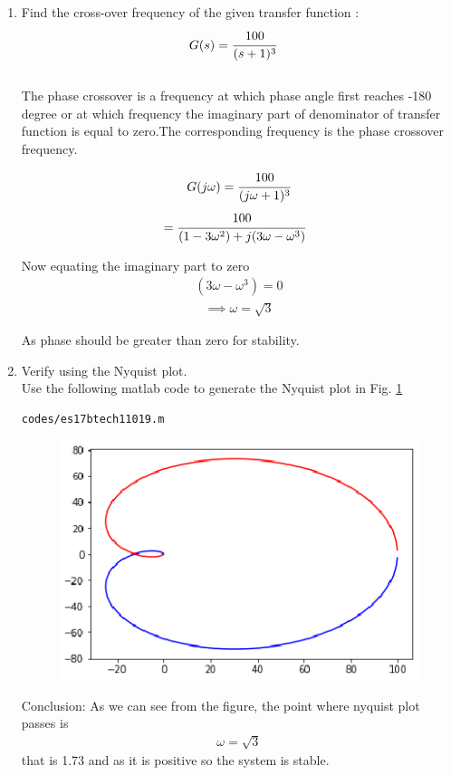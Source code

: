 \begin{enumerate}[label=\thesection.\arabic*.,ref=\thesection.\theenumi]

\item  Find the cross-over frequency of the  given transfer function :
\begin{align}
\label{eq:es17btech11019_system}
G(s) &= \cfrac{100}{(s+1)^3}
\end{align}
\\
\solution The phase crossover is a frequency at which phase angle first reaches -180 degree or at which frequency the imaginary part of denominator of transfer function is equal to zero.The corresponding frequency is the phase crossover frequency.


\begin{align}
G(j\omega)=\cfrac{100}{(j\omega+1)^3}
\end{align}
\begin{align}
 &= \cfrac{100}{(1-3\omega^2)+j(3\omega-\omega^3)}
\end{align}
     
Now equating the imaginary part to zero
\begin{align}
(3\omega-\omega^3)=0
\end{align}  
\begin{align}
\implies \omega = \sqrt{3}
\end{align}

As phase should be greater than zero for stability.

\item Verify using the Nyquist plot.
\\
\solution Use the following matlab code to generate the Nyquist plot in Fig.  \ref{fig:es17btech11019}
\begin{lstlisting}
codes/es17btech11019.m
\end{lstlisting}
%
\begin{figure}[!h]
\centering
  \includegraphics[width=\columnwidth]{./figs/es17btech11019.eps}
  \caption{}
  \label{fig:es17btech11019}
\end{figure}


Conclusion: As we can see from the figure, the point where nyquist plot passes is
\begin{align}
{\omega=\sqrt{3}}
\end{align}
that is 1.73 and as it is positive so the system is stable.


\end{enumerate}
